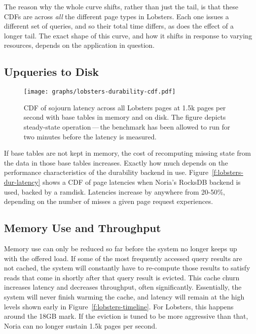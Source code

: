 The reason why the whole curve shifts, rather than just the tail, is that these
CDFs are across \emph{all} the different page types in Lobsters. Each one issues
a different set of queries, and so their total time differs, as does the effect
of a longer tail. The exact shape of this curve, and how it shifts in response
to varying resources, depends on the application in question.

\subsection{Upqueries to Disk}

\begin{figure}[h]
  \centering
  \texttt{[image: graphs/lobsters-durability-cdf.pdf]}
  \caption{CDF of sojourn latency across all Lobsters pages at 1.5k pages per
  second with base tables in memory and on disk. The figure depicts steady-state
  operation\,---\,the benchmark has been allowed to run for two minutes before
  the latency is measured.}
  \label{f:lobsters-dur-latency}
\end{figure}

If base tables are not kept in memory, the cost of recomputing missing state
from the data in those base tables increases. Exactly how much depends on the
performance characteristics of the durability backend in use.
Figure~\vref{f:lobsters-dur-latency} shows a CDF of page latencies when Noria's
RocksDB backend is used, backed by a ramdisk. Latencies increase by anywhere
from 20-50\%, depending on the number of misses a given page request
experiences.

\subsection{Memory Use and Throughput}

Memory use can only be reduced so far before the system no longer keeps up with
the offered load. If some of the most frequently accessed query results are not
cached, the system will constantly have to re-compute those results to satisfy
reads that come in shortly after that query result is evicted. This cache churn
increases latency and decreases throughput, often significantly. Essentially,
the system will never finish warming the cache, and latency will remain at the
high levels shown early in Figure~\ref{f:lobsters-timeline}. For Lobsters, this
happens around the 18GB mark. If the eviction is tuned to be more aggressive
than that, Noria can no longer sustain 1.5k pages per second.

